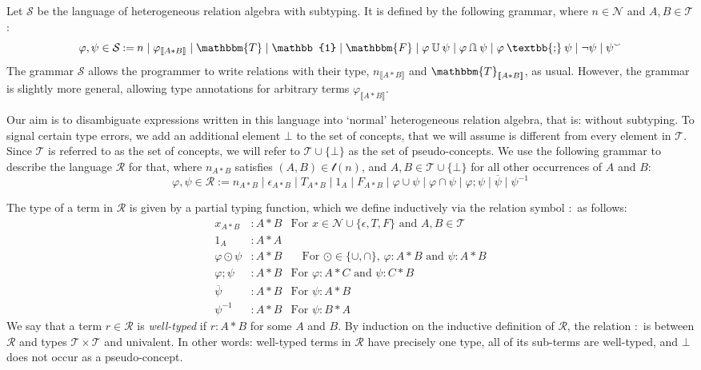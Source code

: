 \documentclass[12pt]{article}
\newcommand{\typesemi}{\mathbin{\text{\textbb{;}}}}
\newcommand{\typeunion}{\mathbin{\mathbb{U}}}
\newcommand{\typeinter}{\mathbin{\text{\rotatebox[origin=c]{180}{$\typeunion$}}}}
\newcommand{\typevee}{\mathbbm{T}}
\newcommand{\typenil}{\mathbbm{F}}
\newcommand{\typecomp}[1]{\neg{#1}}
\newcommand{\typeconv}[1]{{#1}^\smallsmile}
\newcommand{\typeident}{\mathbb{1}}
\newcommand{\typetyped}[2]{{#1}_{\llbracket #2 \rrbracket}}
\newcommand{\conv}[1]{{#1}^{-1}}
\begin{document}
Let $\mathcal{S}$ be the language of heterogeneous relation algebra with subtyping.
It is defined by the following grammar, where $n\in\mathcal{N}$ and $A,B\in\mathcal{T}$:
\[
\varphi,\psi\in\mathcal{S} \mathbin{:=} n \mid \typetyped{\varphi}{A*B} \mid \typevee \mid \typeident \mid \typenil \mid \varphi \typeunion \psi \mid \varphi \typeinter \psi \mid \varphi \typesemi \psi \mid \typecomp{\psi}\mid \typeconv{\psi}
\]
The grammar $\mathcal{S}$ allows the programmer to write relations with their type, $\typetyped{n}{A*B}$ and $\typetyped{\typevee}{A*B}$, as usual.
However, the grammar is slightly more general, allowing type annotations for arbitrary terms $\typetyped{\varphi}{A*B}$.

Our aim is to disambiguate expressions written in this language into `normal' heterogeneous relation algebra, that is: without subtyping.
To signal certain type errors, we add an additional element $\bot$ to the set of concepts, that we will assume is different from every element in $\mathcal{T}$.
Since $\mathcal{T}$ is referred to as the set of concepts, we will refer to $\mathcal{T}\cup\{\bot\}$ as the set of pseudo-concepts.
We use the following grammar to describe the language $\mathcal{R}$ for that, where $n_{A*B}$ satisfies $(A,B)\in \mathcal{t}(n)$, and $A,B\in\mathcal{T}\cup\{\bot\}$ for all other occurrences of $A$ and $B$:
\[
\varphi,\psi\in\mathcal{R} \mathbin{:=} n_{A*B} \mid \epsilon_{A*B} \mid T_{A*B} \mid 1_{A} \mid F_{A*B} \mid \varphi \cup \psi \mid \varphi \cap \psi \mid \varphi ; \psi \mid \overline{\psi}\mid \conv{\psi}
\]

The type of a term in $\mathcal{R}$ is given by a partial typing function, which we define inductively via the relation symbol $:$ as follows:
\begin{align*}
x_{A*B} &: A * B & \text{For $x \in \mathcal{N} \cup \{\epsilon, T, F\}$ and $A,B\in \mathcal{T}$}\\
1_{A} &: A * A&\\
\varphi \odot \psi &: A * B &\quad\text{For $\odot \in \{\cup,\cap\}$, $\varphi : A * B$ and $\psi : A * B$}\\
\varphi ; \psi &: A * B &\text{For $\varphi : A * C$ and $\psi : C * B$}\\
\overline{\psi} &: A * B &\text{For $\psi : A * B$}\\
\conv{\psi} &: A * B &\text{For $\psi : B * A$}
\end{align*}
We say that a term $r\in \mathcal{R}$ is \emph{well-typed} if $r : A*B$ for some $A$ and $B$.
By induction on the inductive definition of $\mathcal{R}$, the relation $:$ is between $\mathcal{R}$ and types $\mathcal{T}\times\mathcal{T}$ and univalent.
In other words: well-typed terms in $\mathcal{R}$ have precisely one type, all of its sub-terms are well-typed, and $\bot$ does not occur as a pseudo-concept.
\end{document}
